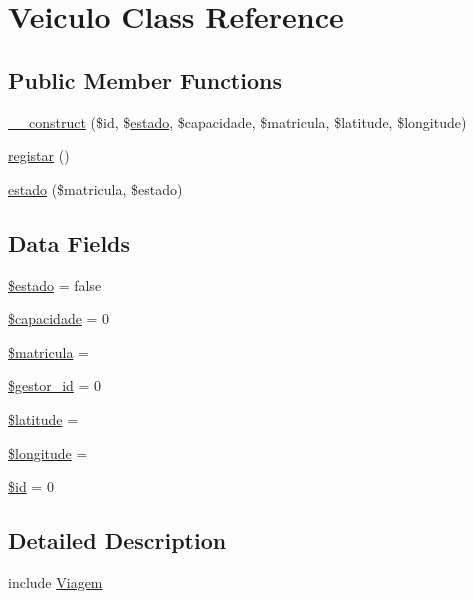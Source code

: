 \hypertarget{class_veiculo}{}\section{Veiculo Class Reference}
\label{class_veiculo}
\subsection*{Public Member Functions}
\begin{DoxyCompactItemize}
\item 
\hyperlink{class_veiculo_ad6b96fc10dcf98eafe51d899ddc108db}{\+\_\+\+\_\+construct} (\$id, \$\hyperlink{class_veiculo_aa49cfdb8a3b1913d191c41ad00c69c62}{estado}, \$capacidade, \$matricula, \$latitude, \$longitude)
\item 
\hyperlink{class_veiculo_ac73fd1ef0f003bc98b2ef85d3d6b31b2}{registar} ()
\item 
\hyperlink{class_veiculo_aa49cfdb8a3b1913d191c41ad00c69c62}{estado} (\$matricula, \$estado)
\end{DoxyCompactItemize}
\subsection*{Data Fields}
\begin{DoxyCompactItemize}
\item 
\hyperlink{class_veiculo_add65399d2cbedf45a9f2299cf9555539}{\$estado} = false
\item 
\hyperlink{class_veiculo_a2bb92980404e3521fc8b466f67b62ae0}{\$capacidade} = 0
\item 
\hyperlink{class_veiculo_a981952d6d80353d7e767797f7eeac2f6}{\$matricula} = \textquotesingle{}\textquotesingle{}
\item 
\hyperlink{class_veiculo_a0a417a750596945da402317f18bc0d1c}{\$gestor\+\_\+id} = 0
\item 
\hyperlink{class_veiculo_a5635a7326fb0b96e184ca6f5baa13e94}{\$latitude} = \textquotesingle{}\textquotesingle{}
\item 
\hyperlink{class_veiculo_aabb5b5c018fed3789fce382e336cfa47}{\$longitude} = \textquotesingle{}\textquotesingle{}
\item 
\hyperlink{class_veiculo_ae97941710d863131c700f069b109991e}{\$id} = 0
\end{DoxyCompactItemize}


\subsection{Detailed Description}
include \hyperlink{class_viagem}{Viagem}

